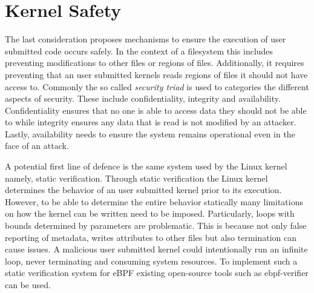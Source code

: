 

\section{Kernel Safety}

The last consideration proposes mechanisms to ensure the execution of user
submitted code occurs safely. In the context of a filesystem this includes
preventing modifications to other files or regions of files. Additionally, it
requires preventing that an user submitted kernels reads regions of files it
should not have access to. Commonly the so called \textit{security triad} is
used to categories the different aspects of security. These
include confidentiality, integrity and availability. Confidentiality ensures
that no one is able to access data they should not be able to while integrity
ensures any data that is read is not modified by an attacker. Lastly,
availability needs to ensure the system remains operational even in the face of
an attack.

A potential first line of defence is the same system used by the Linux kernel
namely, static verification. Through static verification the Linux kernel
determines the behavior of an user submitted kernel prior to its execution.
However, to be able to determine the entire behavior statically many limitations
on how the kernel can be written need to be imposed. Particularly, loops with
bounds determined by parameters are problematic. This is because not only
false reporting of metadata, writes attributes to other files but also
termination can cause issues. A malicious user submitted kernel could
intentionally run an infinite loop, never terminating and consuming system
resources. To implement such a static verification system for eBPF existing
open-source tools such as ebpf-verifier \cite{ebpf-verifier} can be used.

